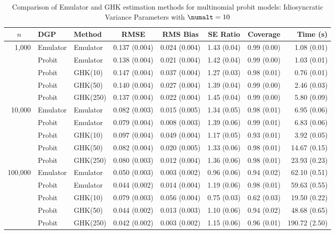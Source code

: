 \begin{table}[htbp]
\centering
\footnotesize
\begin{tabular}{@{}rllrrrrr@{}}
\toprule
\multicolumn{1}{c}{$n$} & \multicolumn{1}{l}{DGP} & \multicolumn{1}{l}{Method} & \multicolumn{1}{c}{RMSE} & \multicolumn{1}{c}{RMS Bias} & \multicolumn{1}{c}{SE Ratio} & \multicolumn{1}{c}{Coverage} & \multicolumn{1}{r}{Time (s)} \\
\midrule
\multirow{5}{*}{1,000} & Emulator & Emulator & 0.137 (0.004) & 0.024 (0.004) & 1.43 (0.04) & 0.99 (0.00) & 1.08 (0.01) \\
 & Probit & Emulator & 0.138 (0.004) & 0.021 (0.004) & 1.42 (0.04) & 0.99 (0.00) & 1.03 (0.01) \\
 & Probit & GHK(10) & 0.147 (0.004) & 0.037 (0.004) & 1.27 (0.03) & 0.98 (0.01) & 0.76 (0.01) \\
 & Probit & GHK(50) & 0.140 (0.004) & 0.027 (0.004) & 1.39 (0.04) & 0.99 (0.00) & 2.46 (0.03) \\
 & Probit & GHK(250) & 0.137 (0.004) & 0.022 (0.004) & 1.45 (0.04) & 0.99 (0.00) & 5.80 (0.09) \\
\midrule
\multirow{5}{*}{10,000} & Emulator & Emulator & 0.082 (0.003) & 0.015 (0.005) & 1.34 (0.05) & 0.98 (0.01) & 6.95 (0.06) \\
 & Probit & Emulator & 0.079 (0.004) & 0.008 (0.003) & 1.39 (0.06) & 0.99 (0.01) & 6.83 (0.06) \\
 & Probit & GHK(10) & 0.097 (0.004) & 0.049 (0.004) & 1.17 (0.05) & 0.93 (0.01) & 3.92 (0.05) \\
 & Probit & GHK(50) & 0.082 (0.004) & 0.020 (0.005) & 1.33 (0.06) & 0.98 (0.01) & 14.67 (0.15) \\
 & Probit & GHK(250) & 0.080 (0.003) & 0.012 (0.004) & 1.36 (0.06) & 0.98 (0.01) & 23.93 (0.23) \\
\midrule
\multirow{5}{*}{100,000} & Emulator & Emulator & 0.050 (0.003) & 0.003 (0.002) & 0.96 (0.06) & 0.94 (0.02) & 62.10 (0.51) \\
 & Probit & Emulator & 0.044 (0.002) & 0.014 (0.004) & 1.19 (0.06) & 0.98 (0.01) & 59.63 (0.55) \\
 & Probit & GHK(10) & 0.079 (0.003) & 0.056 (0.004) & 0.75 (0.03) & 0.62 (0.03) & 19.50 (0.22) \\
 & Probit & GHK(50) & 0.044 (0.002) & 0.013 (0.003) & 1.10 (0.06) & 0.94 (0.02) & 48.68 (0.65) \\
 & Probit & GHK(250) & 0.042 (0.002) & 0.003 (0.002) & 1.15 (0.06) & 0.96 (0.01) & 190.72 (2.50) \\
\bottomrule
\end{tabular}
\caption{Comparison of Emulator and GHK estimation methods for multinomial probit models: Idiosyncratic Variance Parameters with $\numalt=10$}
\label{tab:emulator_vs_ghk:10:psi}
\end{table}
